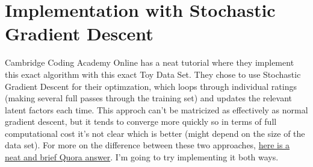 \documentclass[11pt]{article}
\begin{document}
    \section{Implementation with Stochastic Gradient
Descent}\label{implementation-with-stochastic-gradient-descent}

Cambridge Coding Academy Online has a neat tutorial where they implement
this exact algorithm with this exact Toy Data Set. They chose to use
Stochastic Gradient Descent for their optimzation, which loops through
individual ratings (making several full passes through the training set)
and updates the relevant latent factors each time. This approch can't be
matricized as effectively as normal gradient descent, but it tends to
converge more quickly so in terms of full computational cost it's not
clear which is better (might depend on the size of the data set). For
more on the difference between these two approaches,
\href{https://www.quora.com/Whats-the-difference-between-gradient-descent-and-stochastic-gradient-descent/answer/Sebastian-Raschka-1?srid=vrN4}{here
is a neat and brief Quora answer}. I'm going to try implementing it both
ways.
\end{document}
